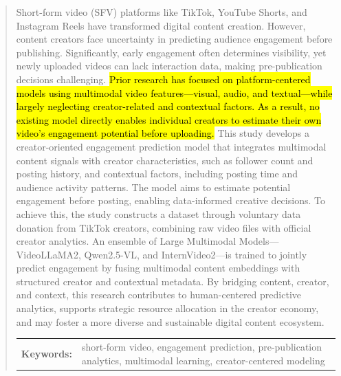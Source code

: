 \begin{abstract}
Short-form video (SFV) platforms like TikTok, YouTube Shorts, and Instagram Reels have transformed digital content creation. However, content creators face uncertainty in predicting audience engagement before publishing. Significantly, early engagement often determines visibility, yet newly uploaded videos can lack interaction data, making pre-publication decisions challenging. \hl{Prior research has focused on platform-centered models using multimodal video features—visual, audio, and textual—while largely neglecting creator-related and contextual factors. As a result, no existing model directly enables individual creators to estimate their own video's engagement potential before uploading.} This study develops a creator-oriented engagement prediction model that integrates multimodal content signals with creator characteristics, such as follower count and posting history, and contextual factors, including posting time and audience activity patterns. The model aims to estimate potential engagement before posting, enabling data-informed creative decisions. To achieve this, the study constructs a dataset through voluntary data donation from TikTok creators, combining raw video files with official creator analytics. An ensemble of Large Multimodal Models—VideoLLaMA2, Qwen2.5-VL, and InternVideo2—is trained to jointly predict engagement by fusing multimodal content embeddings with structured creator and contextual metadata. By bridging content, creator, and context, this research contributes to human-centered predictive analytics, supports strategic resource allocation in the creator economy, and may foster a more diverse and sustainable digital content ecosystem.

%
%


\begin{flushleft}
\begin{tabular}{lp{4.25in}}
\hspace{-0.5em}\textbf{Keywords:}\hspace{0.25em} & short-form video, engagement prediction, pre-publication analytics, multimodal learning, creator-centered modeling
\end{tabular}
\end{flushleft}
\end{abstract}